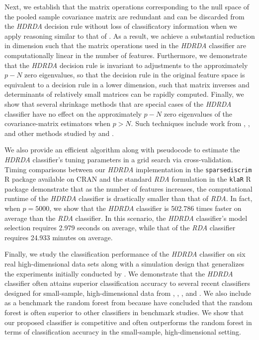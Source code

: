 \documentclass[]{interact}\usepackage[]{graphicx}\usepackage[]{color}
\begin{document}
Next, we establish that the matrix operations corresponding to the null space of
the pooled sample covariance matrix are redundant and can be discarded from the
\emph{HDRDA} decision rule without loss of classificatory information when we
apply reasoning similar to that of \cite{Ye:2006tq}. As a result, we achieve a
substantial reduction in dimension such that the matrix operations used in the
\emph{HDRDA} classifier are computationally linear in the number of features.
Furthermore, we demonstrate that the \emph{HDRDA} decision rule is invariant to
adjustments to the approximately $p - N$ zero eigenvalues, so that the decision
rule in the original feature space is equivalent to a decision rule in a lower
dimension, such that matrix inverses and determinants of relatively small
matrices can be rapidly computed. Finally, we show that several shrinkage
methods that are special cases of the \emph{HDRDA} classifier have no effect on
the approximately $p - N$ zero eigenvalues of the covariance-matrix estimators
when $p > N$. Such techniques include work from \cite{Srivastava:2007ww},
\cite{Rao:1971ul}, and other methods studied by \cite{Ramey:2013ji} and
\cite{Xu:2009fl}.

We also provide an efficient algorithm along with pseudocode to estimate the
\emph{HDRDA} classifier's tuning parameters in a grid search via
cross-validation. Timing comparisons between our \emph{HDRDA} implementation in
the {\tt sparsediscrim} R package available on CRAN and the standard \emph{RDA}
formulation in the {\tt klaR} R package demonstrate that as the number of
features increases, the computational runtime of the \emph{HDRDA} classifier is
drastically smaller than that of \emph{RDA}. In fact, when $p = 5000$, we show
that the \emph{HDRDA} classifier is 502.786
times faster on average than the \emph{RDA} classifier. In this scenario, the
\emph{HDRDA} classifier's model selection requires 2.979
seconds on average, while that of the \emph{RDA} classifier requires
24.933 minutes on average.

Finally, we study the classification performance of the \emph{HDRDA} classifier
on six real high-dimensional data sets along with a simulation design that
generalizes the experiments initially conducted by \cite{Guo:2007te}. We
demonstrate that the \emph{HDRDA} classifier often attains superior
classification accuracy to several recent classifiers designed for small-sample,
high-dimensional data from \cite*{Tong:2012hw}, \cite{Witten:2011kc},
\cite*{Pang:2009ik}, and \cite{Guo:2007te}. We also include as a benchmark the
random forest from \cite{Breiman:2001fb} because \cite*{FernandezDelgado:2014ul}
have concluded that the random forest is often superior to other classifiers in
benchmark studies. We show that our proposed classifier is competitive and often
outperforms the random forest in terms of classification accuracy in the
small-sample, high-dimensional setting.
\end{document}
